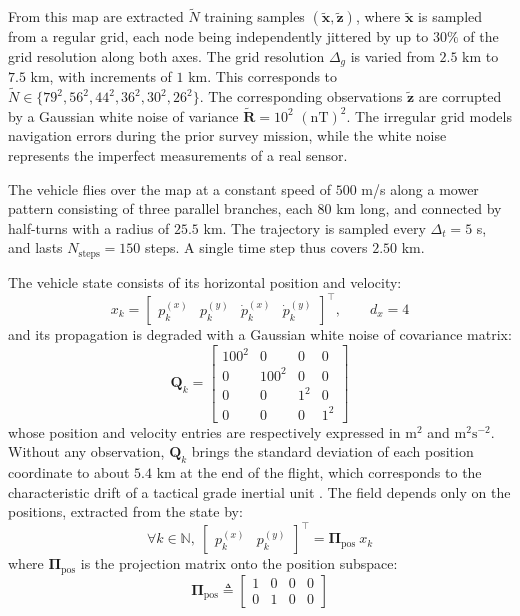 From this map are extracted $\tilde{N}$ training samples $(\tilde{\mathbf{x}},\tilde{\mathbf{z}})$, where $\tilde{\mathbf{x}}$ is sampled from a regular grid, each node being independently jittered by up to $30\%$ of the grid resolution along both axes. The grid resolution $\Delta_g$ is varied from $2.5$ km to $7.5$ km, with increments of $1$ km. This corresponds to $\tilde{N}\in\{79^2,56^2,44^2,36^2,30^2,26^2\}$. The corresponding observations $\tilde{\mathbf{z}}$ are corrupted by a Gaussian white noise of variance $\tilde{\mathbf{R}}=10^2$ $(\text{nT})^2$. The irregular grid models navigation errors during the prior survey mission, while the white noise represents the imperfect measurements of a real sensor.

The vehicle flies over the map at a constant speed of $500$ m/s along a mower pattern consisting of three parallel branches, each $80$ km long, and connected by half-turns with a radius of $25.5$ km. The trajectory is sampled every $\Delta_t=5$ s, and lasts $N_\mathrm{steps}=150$ steps. A single time step thus covers $2.50$ km.

The vehicle state consists of its horizontal position and velocity:
\begin{equation}
	x_k=\begin{bmatrix}
	p_k^{(x)}&p_k^{(y)}&\dot{p}_k^{(x)}&\dot{p}_k^{(y)}
	\end{bmatrix}^\top,\qquad d_x=4
\end{equation}
and its propagation is degraded with a Gaussian white noise of covariance matrix:
\begin{equation}
	\mathbf{Q}_k=\begin{bmatrix}
	100^2&0&0&0\\
	0&100^2&0&0\\
	0&0&1^2&0\\
	0&0&0&1^2
	\end{bmatrix}
\end{equation}
whose position and velocity entries are respectively expressed in $\text{m}^2$ and $\text{m}^2\text{s}^{-2}$. Without any observation, $\mathbf{Q}_k$ brings the standard deviation of each position coordinate to about $5.4$ km at the end of the flight, which corresponds to the characteristic drift of a tactical grade inertial unit \cite{bib:inertial-grades}. The field depends only on the positions, extracted from the state by:
\begin{equation}
	\forall k\in\mathbb{N},\:\begin{bmatrix}
	p_k^{(x)}&p_k^{(y)}
	\end{bmatrix}^\top=\boldsymbol{\Pi}_{\mathrm{pos}}\:x_k
\end{equation}
where $\boldsymbol{\Pi}_{\mathrm{pos}}$ is the projection matrix onto the position subspace:
\begin{equation}
	\boldsymbol{\Pi}_{\mathrm{pos}}\triangleq\begin{bmatrix}
	1&0&0&0\\
	0&1&0&0
	\end{bmatrix}
\end{equation}

